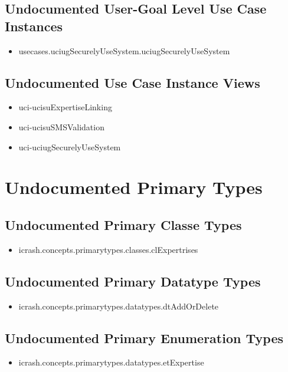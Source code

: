 \subsection[Undocumented Use Case Instances - User-Goal Level]{Undocumented User-Goal Level Use Case Instances}
\begin{itemize}
\item usecases.uciugSecurelyUseSystem.uciugSecurelyUseSystem 
\end{itemize}


\subsection[Undocumented Use Case Instance Views]{Undocumented Use Case Instance Views}
\begin{itemize}
\item uci-ucisuExpertiseLinking 
\item uci-ucisuSMSValidation 
\item uci-uciugSecurelyUseSystem 
\end{itemize}






\section[Undocumented Primary Types]{Undocumented Primary Types}

\subsection[Undocumented Primary Classe Types]{Undocumented Primary Classe Types}
\begin{itemize}
\item icrash.concepts.primarytypes.classes.clExpertrises 
\end{itemize}

\subsection[Undocumented Primary Datatype Types]{Undocumented Primary Datatype Types}
\begin{itemize}
\item icrash.concepts.primarytypes.datatypes.dtAddOrDelete 
\end{itemize}

\subsection[Undocumented Primary Enumeration Types]{Undocumented Primary Enumeration Types}
\begin{itemize}
\item icrash.concepts.primarytypes.datatypes.etExpertise 
\end{itemize}







